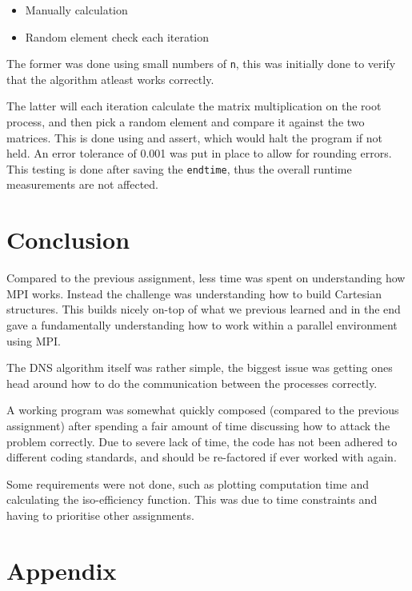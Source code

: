 \documentclass[a4paper,11pt,oneside]{book}
\begin{document}
\begin{itemize}
\item Manually calculation
\item Random element check each iteration
\end{itemize}

The former was done using small numbers of \verb!n!, this was initially done to verify that the algorithm atleast works correctly.

The latter will each iteration calculate the matrix multiplication on the root process, and then pick a random element and compare it against the two matrices. This is done using and assert, which would halt the program if not held. An error tolerance of 0.001 was put in place to allow for rounding errors.
This testing is done after saving the \verb!endtime!, thus the overall runtime measurements are not affected.

\chapter{Conclusion}
Compared to the previous assignment, less time was spent on understanding how MPI works. Instead the challenge was understanding how to build Cartesian structures. This builds nicely on-top of what we previous learned and in the end gave a fundamentally understanding how to work within a parallel environment using MPI.

The DNS algorithm itself was rather simple, the biggest issue was getting ones head around how to do the communication between the processes correctly.

A working program was somewhat quickly composed (compared to the previous assignment) after spending a fair amount of time discussing how to attack the problem correctly. Due to severe lack of time, the code has not been adhered to different coding standards, and should be re-factored if ever worked with again.

Some requirements were not done, such as plotting computation time and calculating the iso-efficiency function. This was due to time constraints and having to prioritise other assignments.


\chapter{Appendix}
\end{document}
